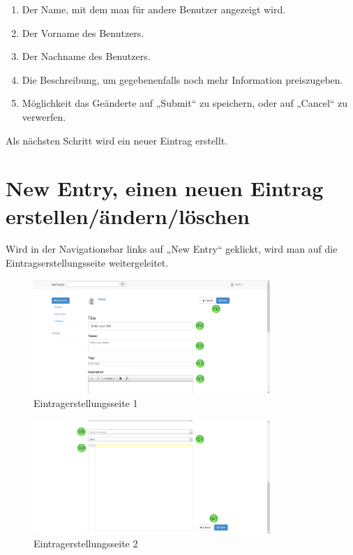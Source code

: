 \begin{enumerate}
\item Der Name, mit dem man für andere Benutzer angezeigt wird.
\item Der Vorname des Benutzers.
\item Der Nachname des Benutzers.
\item Die Beschreibung, um gegebenenfalls noch mehr Information preiszugeben.
\item Möglichkeit das Geänderte auf „Submit“ zu speichern, oder auf „Cancel“ zu verwerfen.
\end{enumerate}


Als nächsten Schritt wird ein neuer Eintrag erstellt.


\chapter{New Entry, einen neuen Eintrag erstellen/ändern/löschen}

Wird in der Navigationsbar links auf „New Entry“ geklickt, wird man auf die Eintragserstellungsseite weitergeleitet.

\begin{figure}[H]
    \centering
    \includegraphics[width=0.8\textwidth]{Bilder/11.png}
    \caption{Eintragerstellungsseite 1 }
    \label{fig:eintragerstellungsseite1}
\end{figure}
\begin{figure}[H]
    \centering
    \includegraphics[width=0.8\textwidth]{Bilder/12.png}
    \caption{Eintragerstellungsseite 2 }
    \label{fig:eintragerstellungsseite2}
\end{figure}


